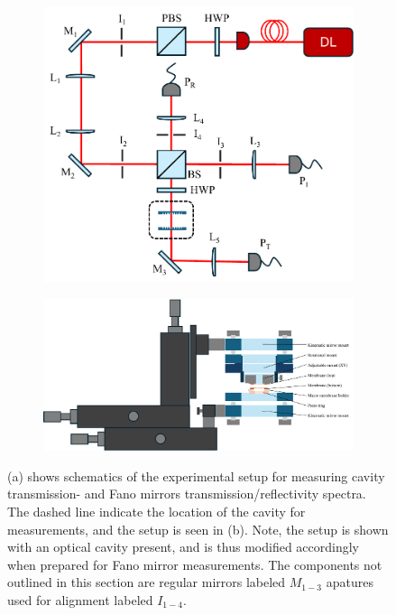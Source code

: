 \begin{figure}[h!]
    \centering
    \begin{subfigure}[b]{0.4\textwidth}
        \includegraphics[width=\textwidth]{figures/setup_sketch.pdf}
        \caption{}
        \label{fig:setup_sketch}
    \end{subfigure}
    \hfill
    \begin{subfigure}[b]{0.59\textwidth}
        \includegraphics[width=\textwidth]{figures/setup_skecth_zoomed.pdf}
        \caption{}
        \label{fig:setup_zoomed}
    \end{subfigure}
    \caption{(a) shows schematics of the experimental setup for measuring cavity transmission- and Fano mirrors transmission/reflectivity spectra. The dashed line indicate the location of the cavity for measurements, and the setup is seen in (b). Note, the setup is shown with an optical cavity present, and is thus modified accordingly when prepared for Fano mirror measurements. The components not outlined in this section are regular mirrors labeled $M_{1-3}$ apatures used for alignment labeled $I_{1-4}$.}
    \label{fig:experimental_setup}
\end{figure}

